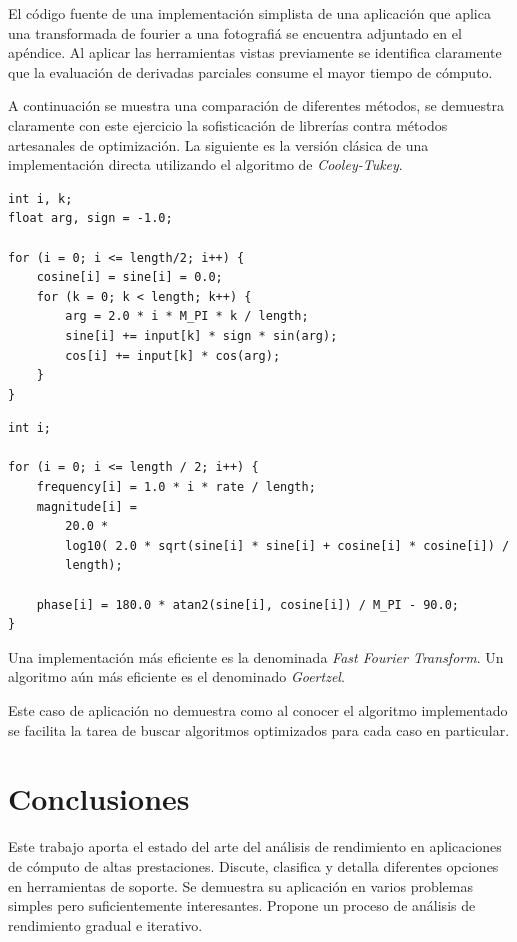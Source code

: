 \documentclass[a4paper]{report}
\begin{document}
\bigskip

El código fuente de una implementación simplista de una aplicación que aplica una transformada de fourier a una fotografiá 
se encuentra adjuntado en el apéndice. Al aplicar las herramientas vistas previamente se identifica
claramente que la evaluación de derivadas parciales consume el mayor tiempo
de cómputo.

\bigskip

A continuación se muestra una comparación de diferentes métodos, se
demuestra claramente con este ejercicio la sofisticación de librerías
contra métodos artesanales de optimización. La siguiente es la versión
clásica de una implementación directa utilizando el algoritmo de
{\it Cooley-Tukey}.

\begin{lstlisting}
int i, k;
float arg, sign = -1.0;

for (i = 0; i <= length/2; i++) {
    cosine[i] = sine[i] = 0.0;
    for (k = 0; k < length; k++) {
        arg = 2.0 * i * M_PI * k / length;
        sine[i] += input[k] * sign * sin(arg);
        cos[i] += input[k] * cos(arg);
    }
}
\end{lstlisting}

\begin{lstlisting}
int i;

for (i = 0; i <= length / 2; i++) {
    frequency[i] = 1.0 * i * rate / length;
    magnitude[i] =
        20.0 *
        log10( 2.0 * sqrt(sine[i] * sine[i] + cosine[i] * cosine[i]) /
        length);

    phase[i] = 180.0 * atan2(sine[i], cosine[i]) / M_PI - 90.0;
}
\end{lstlisting}

Una implementación más eficiente es la denominada {\it Fast Fourier Transform}.
Un algoritmo aún más eficiente es el denominado {\it Goertzel}.

\bigskip

Este caso de aplicación no demuestra como al conocer el algoritmo implementado se
facilita la tarea de buscar algoritmos optimizados para cada caso en particular.

\chapter{Conclusiones}

Este trabajo aporta el estado del arte del análisis de rendimiento en
aplicaciones de cómputo de altas prestaciones. Discute, clasifica y detalla
diferentes opciones en herramientas de soporte. Se demuestra su aplicación
en varios problemas simples pero suficientemente interesantes. Propone un
proceso de análisis de rendimiento gradual e iterativo.
\end{document}

